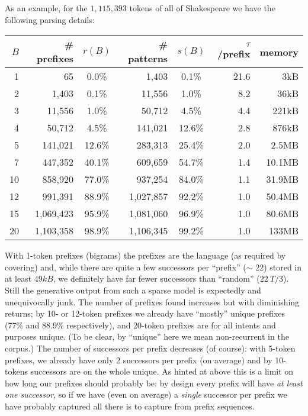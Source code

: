 \documentclass[11pt, oneside]{amsart}   	%
\begin{document}
As an example, for the $1,115,393$ tokens of all of Shakespeare we have the following parsing details:
\begin{center}
\begin{small}
\begin{tabular}{ r r c r c r r }
 $B$ & \# prefixes & $r(B)$ & \# patterns & $s(B)$ & $\tau$/prefix & memory \\ \hline
 1 & 65 & 0.0\% & 1,403 & 0.1\% & 21.6 & 3kB \\  
 2 & 1,403 & 0.1\% & 11,556 & 1.0\% & 8.2 & 36kB \\  
 3 & 11,556 & 1.0\% & 50,712 & 4.5\% & 4.4 & 221kB \\
 4 & 50,712 & 4.5\% & 141,021 & 12.6\% & 2.8 & 876kB \\
 5 & 141,021 & 12.6\% & 283,313 & 25.4\% & 2.0 & 2.5MB \\
 7 & 447,352 & 40.1\% & 609,659 & 54.7\% & 1.4 & 10.1MB \\
 10 & 858,920 & 77.0\% & 937,254 & 84.0\% & 1.1 & 31.9MB \\  
 12 & 991,391 & 88.9\% & 1,027,857 & 92.2\% & 1.0 & 50.4MB \\
 15 & 1,069,423 & 95.9\% & 1,081,060 & 96.9\% & 1.0 & 80.6MB \\  
 20 & 1,103,358 & 98.9\% & 1,106,345 & 99.2\% & 1.0 & 133MB \\  \hline
\end{tabular}
\end{small}
\end{center}
With 1-token prefixes (bigrams) the prefixes are the language (as required by covering) and, while there are quite a few successors per ``prefix'' ($\sim$ 22) stored in at least $49kB$, we definitely have far fewer successors than ``random'' ($22 ~ T/3$). Still the generative output from such a sparse model is expectedly and unequivocally junk. The number of prefixes found increases but with diminishing returns; by 10- or 12-token prefixes we already have ``mostly'' unique prefixes (77\% and 88.9\% respectively), and 20-token prefixes are for all intents and purposes unique. (To be clear, by ``unique'' here we mean non-recurrent in the corpus.) The number of successors per prefix decreases (of course): with 5-token prefixes, we already have only 2 successors per prefix (on average) and by 10-tokens successors are on the whole unique. As hinted at above this is a limit on how long our prefixes should probably be: by design every prefix will have {\em at least one successor}, so if we have (even on average) a {\em single} successor per prefix we have probably captured all there is to capture from prefix sequences. 
\end{document}
